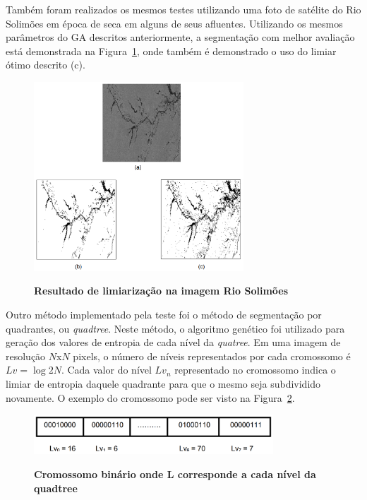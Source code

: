 \documentclass[12pt,oneside,a4paper,english,french,spanish,brazil,]{abntex2}
\begin{document}
Também foram realizados os mesmos testes utilizando uma foto de satélite do Rio Solimões em época de seca em alguns de seus afluentes. Utilizando os mesmos parâmetros do GA descritos anteriormente, a segmentação com melhor avaliação está demonstrada na Figura~\ref{fig:TrCo_Matias_Limiar_2}, onde também é demonstrado o uso do limiar ótimo descrito \cite{gonzalez:2012} (c).

\begin{figure}[ht]
\centering
\caption{\textbf{Resultado de limiarização na imagem Rio Solimões}}
\includegraphics[width=0.7\textwidth]{imagens/TrCo_Matias_Limiar_2.PNG}
\label{fig:TrCo_Matias_Limiar_2}
\end{figure}

Outro método implementado pela teste foi o método de segmentação por quadrantes, ou \textit{quadtree}. Neste método, o algoritmo genético foi utilizado para geração dos valores de entropia de cada nível da \textit{quatree}. Em uma imagem de resolução \(N\)x\(N\) pixels, o número de níveis representados por cada cromossomo é \(Lv=\log 2 N\). Cada valor do nível \(Lv_n\) representado no cromossomo indica o limiar de entropia daquele quadrante para que o mesmo seja subdividido novamente. O exemplo do cromossomo pode ser visto na Figura~\ref{fig:TrCo_Matias_Cromossomo_1}.

\begin{figure}[ht]
\centering
\caption{\textbf{Cromossomo binário onde L corresponde a cada nível da quadtree}}
\includegraphics[width=0.8\textwidth]{imagens/TrCo_Matias_Cromossomo_1.PNG}
\label{fig:TrCo_Matias_Cromossomo_1}
\end{figure}
\end{document}

